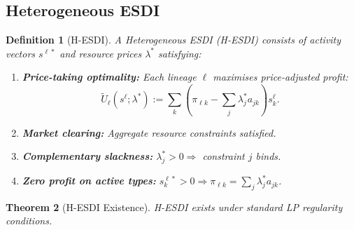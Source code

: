 \documentclass[12pt]{article}
\newtheorem{theorem}{Theorem}[section]
\newtheorem{definition}[theorem]{Definition}
\begin{document}
\subsection{Heterogeneous ESDI}

\begin{definition}[H-ESDI]
A \emph{Heterogeneous ESDI (H-ESDI)} consists of activity vectors $s^{\ell*}$ and resource prices $\lambda^*$ satisfying:
\begin{enumerate}
    \item \textbf{Price-taking optimality:} Each lineage $\ell$ maximises price-adjusted profit:
    \[
    \tilde{U}_\ell(s^\ell; \lambda^*) := \sum_k \left( \pi_{\ell k} - \sum_j \lambda^*_j a_{jk} \right) s^\ell_k.
    \]
    \item \textbf{Market clearing:} Aggregate resource constraints satisfied.
    \item \textbf{Complementary slackness:} $\lambda^*_j > 0 \Rightarrow$ constraint $j$ binds.
    \item \textbf{Zero profit on active types:} $s^{\ell*}_k > 0 \Rightarrow \pi_{\ell k} = \sum_j \lambda^*_j a_{jk}$.
\end{enumerate}
\end{definition}

\begin{theorem}[H-ESDI Existence]
H-ESDI exists under standard LP regularity conditions.
\end{theorem}
\end{document}
